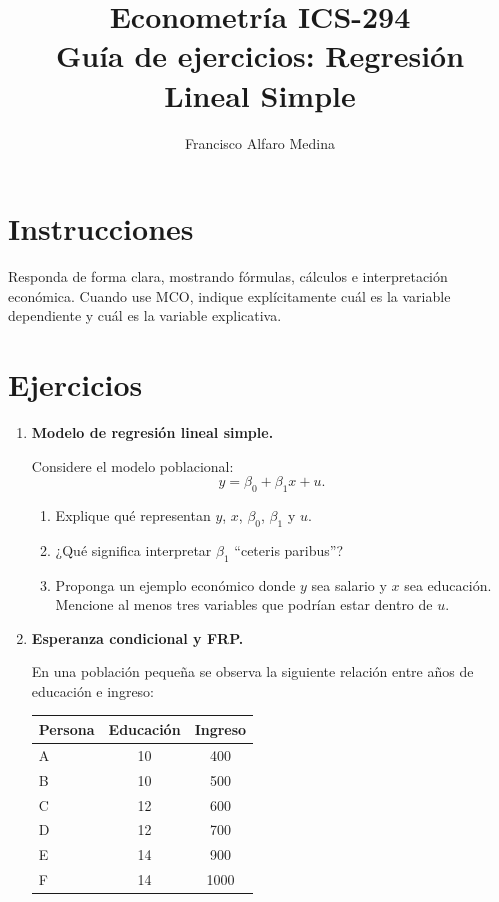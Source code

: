 \documentclass[11pt]{article}
\title{Econometría ICS-294\\Guía de ejercicios: Regresión Lineal Simple}
\author{Francisco Alfaro Medina}
\date{}
\begin{document}
\maketitle

\section*{Instrucciones}
Responda de forma clara, mostrando fórmulas, cálculos e interpretación económica. Cuando use MCO, indique explícitamente cuál es la variable dependiente y cuál es la variable explicativa.

\section*{Ejercicios}

\begin{enumerate}[label=\textbf{Ejercicio \arabic*.}, leftmargin=*]

    \item \textbf{Modelo de regresión lineal simple.}
    
    Considere el modelo poblacional:
    \[
        y=\beta_0+\beta_1x+u.
    \]
    \begin{enumerate}[label=\alph*)]
        \item Explique qué representan $y$, $x$, $\beta_0$, $\beta_1$ y $u$.
        \item ¿Qué significa interpretar $\beta_1$ ``ceteris paribus''?
        \item Proponga un ejemplo económico donde $y$ sea salario y $x$ sea educación. Mencione al menos tres variables que podrían estar dentro de $u$.
    \end{enumerate}

    \item \textbf{Esperanza condicional y FRP.}
    
    En una población pequeña se observa la siguiente relación entre años de educación e ingreso:
    
    \begin{center}
    \begin{tabular}{lcc}
    \toprule
    Persona & Educación & Ingreso \\
    \midrule
    A & 10 & 400 \\
    B & 10 & 500 \\
    C & 12 & 600 \\
    D & 12 & 700 \\
    E & 14 & 900 \\
    F & 14 & 1000 \\
    \bottomrule
    \end{tabular}
    \end{center}
    

\end{enumerate}
\end{document}

